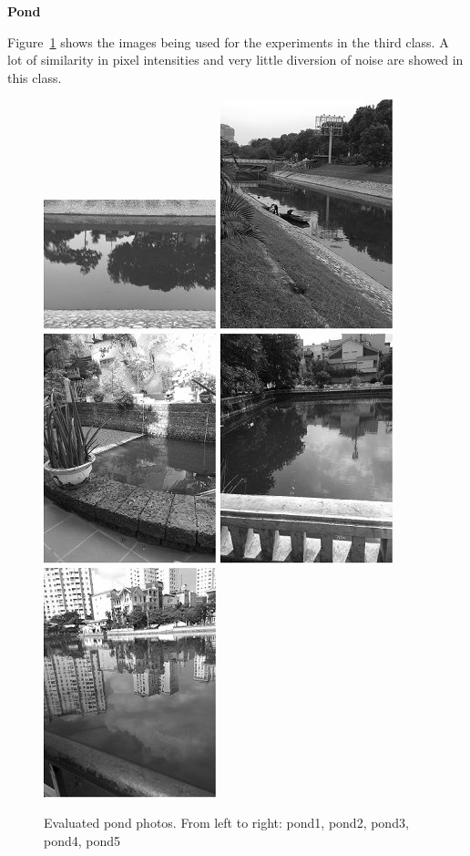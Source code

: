 \newpage

\textbf{Pond}

Figure~\ref{fig:pond} shows the images being used for the experiments in the third class. A lot of similarity in pixel intensities and very little diversion of noise are showed in this class.

\begin{figure}[h]
	\centering
	\includegraphics[width=0.18\columnwidth]{images/pond1.jpg}
	\includegraphics[width=0.18\columnwidth]{images/pond2.jpg}
	\includegraphics[width=0.18\columnwidth]{images/pond3.jpg}
	\includegraphics[width=0.18\columnwidth]{images/pond4.jpg}
	\includegraphics[width=0.18\columnwidth]{images/pond5.jpg}
	\caption{Evaluated pond photos. From left to right: pond1, pond2, pond3, pond4, pond5}
	\label{fig:pond}
\end{figure}


